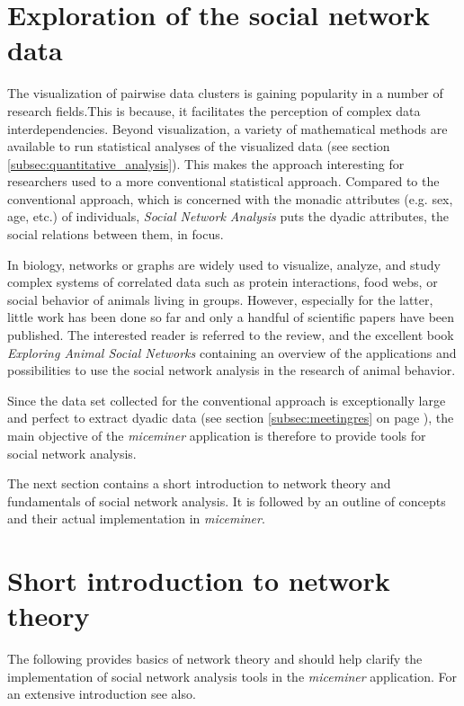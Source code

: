 \section{Exploration of the social network data}
\label{sec:graph}

The visualization of pairwise data clusters is gaining popularity in a number of research fields.This is because, it facilitates the perception of complex data interdependencies. Beyond visualization, a variety of mathematical methods are available to run statistical analyses of the visualized data (see section \ref{subsec:quantitative_analysis}). This makes the approach interesting for researchers used to a more conventional statistical approach. Compared to the conventional approach, which is concerned with the monadic attributes (e.g. sex, age, etc.) of individuals, \textit{Social Network Analysis} puts the dyadic attributes, the social relations between them, in focus.

In biology, networks or graphs are widely used to visualize, analyze, and study complex systems of correlated data such as protein interactions, food webs, or social behavior of animals living in groups. However, especially for the latter, little work has been done so far and only a handful of scientific papers have been published. The interested reader is referred to the review\citep{wey:08}, and the excellent book \textit{Exploring Animal Social Networks}\citep{croft:07} containing an overview of the applications and possibilities to use the social network analysis in the research of animal behavior.

Since the data set collected for the conventional approach is exceptionally large and perfect to extract dyadic data (see section \ref{subsec:meetingres} on page \pageref{subsec:meetingres}), the main objective of the \textit{miceminer} application is therefore to provide tools for social network analysis.

The next section contains a short introduction to network theory and fundamentals of social network analysis. It is followed by an outline of concepts and their actual implementation in \textit{miceminer}.  

\section{Short introduction to network theory}
\label{sec:graph_intro}

The following provides basics of network theory and should help clarify the implementation of social network analysis tools in the \textit{miceminer} application. For an extensive introduction see also\citep{scott:00, hanneman:05, newman:03a}.

